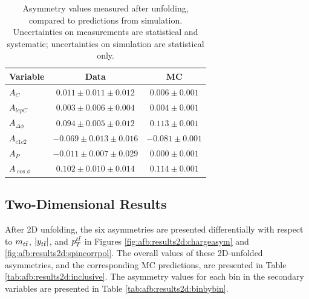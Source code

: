 \begin{table}[hbt]
\begin{center}
\caption{Asymmetry values measured after unfolding, compared to
  predictions from simulation. Uncertainties on measurements are
  statistical and systematic; uncertainties on simulation are
  statistical only.}
\label{tab:afb:results1d}
\begin{tabular}{l |  c  c }
\hline
Variable &  Data  &  MC \\ \hline
$A_{C}$                         &  $0.011 \pm  0.011  \pm 0.012$   &  $ 0.006 \pm 0.001$  \\
$A_{lepC}$                      &  $0.003 \pm  0.006  \pm 0.004$   &  $ 0.004 \pm 0.001$   \\
$A_{\Delta\phi}$                &  $0.094 \pm  0.005  \pm 0.012$   &  $ 0.113 \pm 0.001$   \\
$A_{c1c2}$                      &  $-0.069 \pm  0.013  \pm 0.016$  &  $ -0.081 \pm 0.001$  \\
$A_{P}$                                &  $-0.011 \pm  0.007  \pm 0.029$  &  $ 0.000 \pm 0.001$ \\
$A_{\cos\phi}$                      &  $0.102 \pm  0.010   \pm 0.014$  &  $ 0.114 \pm 0.001$ \\
 \hline
\end{tabular}
\end{center}
\end{table}

\subsection{Two-Dimensional Results}
\label{ssec:afb:results2d}

After 2D unfolding, the six asymmetries are presented differentially
with respect to $m_{t\bar{t}}$, $|y_{t\bar{t}}|$, and $p_T^{t\bar{t}}$ in
Figures \ref{fig:afb:results2d:chargeasym} and
\ref{fig:afb:results2d:spincorrpol}. The overall values of these
2D-unfolded asymmetries, and the corresponding MC predictions, are presented in
Table \ref{tab:afb:results2d:inclusive}. The asymmetry values for each
bin in the secondary variables are presented in Table
\ref{tab:afb:results2d:binbybin}.

